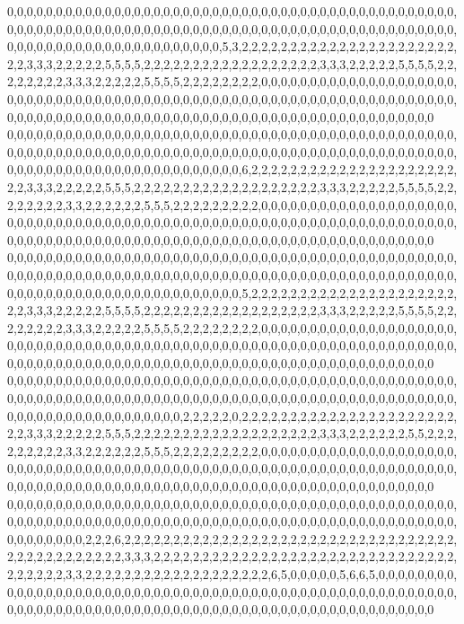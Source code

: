 0,0,0,0,0,0,0,0,0,0,0,0,0,0,0,0,0,0,0,0,0,0,0,0,0,0,0,0,0,0,0,0,0,0,0,0,0,0,0,0,0,0,0,0,0,0,0,0,0,0,0,0,0,0,0,0,0,0,0,0,0,0,0,0,0,0,0,0,0,0,0,0,0,0,0,0,0,0,0,0,0,0,0,0,0,0,0,0,0,0,0,0,0,0,0,0,0,0,0,0,0,0,0,0,0,0,0,0,0,0,0,0,0,0,5,3,2,2,2,2,2,2,2,2,2,2,2,2,2,2,2,2,2,2,2,2,2,2,2,2,3,3,3,2,2,2,2,2,5,5,5,5,2,2,2,2,2,2,2,2,2,2,2,2,2,2,2,2,2,2,3,3,3,2,2,2,2,2,5,5,5,5,2,2,2,2,2,2,2,2,3,3,3,2,2,2,2,2,5,5,5,5,2,2,2,2,2,2,2,2,0,0,0,0,0,0,0,0,0,0,0,0,0,0,0,0,0,0,0,0,0,0,0,0,0,0,0,0,0,0,0,0,0,0,0,0,0,0,0,0,0,0,0,0,0,0,0,0,0,0,0,0,0,0,0,0,0,0,0,0,0,0,0,0,0,0,0,0,0,0,0,0,0,0,0,0,0,0,0,0,0,0,0,0,0,0,0,0,0,0,0,0,0,0,0,0,0,0,0,0,0,0,0,0,0,0,0,0,0,0
0,0,0,0,0,0,0,0,0,0,0,0,0,0,0,0,0,0,0,0,0,0,0,0,0,0,0,0,0,0,0,0,0,0,0,0,0,0,0,0,0,0,0,0,0,0,0,0,0,0,0,0,0,0,0,0,0,0,0,0,0,0,0,0,0,0,0,0,0,0,0,0,0,0,0,0,0,0,0,0,0,0,0,0,0,0,0,0,0,0,0,0,0,0,0,0,0,0,0,0,0,0,0,0,0,0,0,0,0,0,0,0,0,0,0,0,6,2,2,2,2,2,2,2,2,2,2,2,2,2,2,2,2,2,2,2,2,2,2,2,3,3,3,2,2,2,2,2,5,5,5,2,2,2,2,2,2,2,2,2,2,2,2,2,2,2,2,2,2,2,3,3,3,2,2,2,2,2,5,5,5,5,2,2,2,2,2,2,2,2,3,3,2,2,2,2,2,2,5,5,5,2,2,2,2,2,2,2,2,2,0,0,0,0,0,0,0,0,0,0,0,0,0,0,0,0,0,0,0,0,0,0,0,0,0,0,0,0,0,0,0,0,0,0,0,0,0,0,0,0,0,0,0,0,0,0,0,0,0,0,0,0,0,0,0,0,0,0,0,0,0,0,0,0,0,0,0,0,0,0,0,0,0,0,0,0,0,0,0,0,0,0,0,0,0,0,0,0,0,0,0,0,0,0,0,0,0,0,0,0,0,0,0,0,0,0,0,0,0,0
0,0,0,0,0,0,0,0,0,0,0,0,0,0,0,0,0,0,0,0,0,0,0,0,0,0,0,0,0,0,0,0,0,0,0,0,0,0,0,0,0,0,0,0,0,0,0,0,0,0,0,0,0,0,0,0,0,0,0,0,0,0,0,0,0,0,0,0,0,0,0,0,0,0,0,0,0,0,0,0,0,0,0,0,0,0,0,0,0,0,0,0,0,0,0,0,0,0,0,0,0,0,0,0,0,0,0,0,0,0,0,0,0,0,0,0,5,2,2,2,2,2,2,2,2,2,2,2,2,2,2,2,2,2,2,2,2,2,2,2,3,3,3,2,2,2,2,2,5,5,5,5,2,2,2,2,2,2,2,2,2,2,2,2,2,2,2,2,2,2,3,3,3,2,2,2,2,2,5,5,5,5,2,2,2,2,2,2,2,2,3,3,3,2,2,2,2,2,5,5,5,5,2,2,2,2,2,2,2,2,0,0,0,0,0,0,0,0,0,0,0,0,0,0,0,0,0,0,0,0,0,0,0,0,0,0,0,0,0,0,0,0,0,0,0,0,0,0,0,0,0,0,0,0,0,0,0,0,0,0,0,0,0,0,0,0,0,0,0,0,0,0,0,0,0,0,0,0,0,0,0,0,0,0,0,0,0,0,0,0,0,0,0,0,0,0,0,0,0,0,0,0,0,0,0,0,0,0,0,0,0,0,0,0,0,0,0,0,0,0
0,0,0,0,0,0,0,0,0,0,0,0,0,0,0,0,0,0,0,0,0,0,0,0,0,0,0,0,0,0,0,0,0,0,0,0,0,0,0,0,0,0,0,0,0,0,0,0,0,0,0,0,0,0,0,0,0,0,0,0,0,0,0,0,0,0,0,0,0,0,0,0,0,0,0,0,0,0,0,0,0,0,0,0,0,0,0,0,0,0,0,0,0,0,0,0,0,0,0,0,0,0,0,0,0,0,0,0,0,0,2,2,2,2,2,0,2,2,2,2,2,2,2,2,2,2,2,2,2,2,2,2,2,2,2,2,2,2,2,2,3,3,3,2,2,2,2,2,5,5,5,2,2,2,2,2,2,2,2,2,2,2,2,2,2,2,2,2,2,2,3,3,3,2,2,2,2,2,2,5,5,2,2,2,2,2,2,2,2,2,3,3,2,2,2,2,2,2,5,5,5,2,2,2,2,2,2,2,2,2,0,0,0,0,0,0,0,0,0,0,0,0,0,0,0,0,0,0,0,0,0,0,0,0,0,0,0,0,0,0,0,0,0,0,0,0,0,0,0,0,0,0,0,0,0,0,0,0,0,0,0,0,0,0,0,0,0,0,0,0,0,0,0,0,0,0,0,0,0,0,0,0,0,0,0,0,0,0,0,0,0,0,0,0,0,0,0,0,0,0,0,0,0,0,0,0,0,0,0,0,0,0,0,0,0,0,0,0,0,0
0,0,0,0,0,0,0,0,0,0,0,0,0,0,0,0,0,0,0,0,0,0,0,0,0,0,0,0,0,0,0,0,0,0,0,0,0,0,0,0,0,0,0,0,0,0,0,0,0,0,0,0,0,0,0,0,0,0,0,0,0,0,0,0,0,0,0,0,0,0,0,0,0,0,0,0,0,0,0,0,0,0,0,0,0,0,0,0,0,0,0,0,0,0,0,0,0,0,0,0,2,2,2,6,2,2,2,2,2,2,2,2,2,2,2,2,2,2,2,2,2,2,2,2,2,2,2,2,2,2,2,2,2,2,2,2,2,2,2,2,2,2,2,2,2,2,2,2,2,2,3,3,3,2,2,2,2,2,2,2,2,2,2,2,2,2,2,2,2,2,2,2,2,2,2,2,2,2,2,2,2,2,2,2,2,2,2,2,2,2,3,3,2,2,2,2,2,2,2,2,2,2,2,2,2,2,2,2,2,2,2,6,5,0,0,0,0,0,5,6,6,5,0,0,0,0,0,0,0,0,0,0,0,0,0,0,0,0,0,0,0,0,0,0,0,0,0,0,0,0,0,0,0,0,0,0,0,0,0,0,0,0,0,0,0,0,0,0,0,0,0,0,0,0,0,0,0,0,0,0,0,0,0,0,0,0,0,0,0,0,0,0,0,0,0,0,0,0,0,0,0,0,0,0,0,0,0,0,0,0,0,0,0,0,0,0,0,0,0,0
